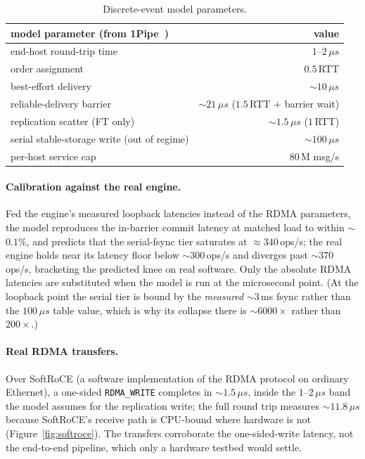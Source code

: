 \begin{table}[ht]\centering\small
\begin{tabular}{lr}
\toprule
model parameter (from 1Pipe~\citep{li2021onepipe}) & value \\
\midrule
end-host round-trip time & $1$--$2\,\mu s$ \\
order assignment & $0.5$\,RTT \\
best-effort delivery & $\sim$$10\,\mu s$ \\
reliable-delivery barrier & $\sim$$21\,\mu s$ ($1.5$\,RTT $+$ barrier wait) \\
replication scatter (FT only) & $\sim$$1.5\,\mu s$ ($1$\,RTT) \\
serial stable-storage write (out of regime) & $\sim$$100\,\mu s$ \\
per-host service cap & $80$\,M msg/s \\
\bottomrule
\end{tabular}
\caption{Discrete-event model parameters.}
\label{tab:model}
\end{table}

\paragraph{Calibration against the real engine.} Fed the engine's measured
loopback latencies instead of the RDMA parameters, the model reproduces
the in-barrier commit latency at matched load to within $\sim$$0.1\%$, and
predicts that the serial-fsync tier saturates at $\approx$$340$\,ops/s;
the real engine holds near its latency floor below $\sim$$300$\,ops/s and
diverges past $\sim$$370$\,ops/s, bracketing the predicted knee on real
software. Only the absolute RDMA latencies are substituted when the model
is run at the microsecond point. (At the loopback point the serial tier is
bound by the \emph{measured} $\sim$$3$\,ms fsync rather than the
$100\,\mu s$ table value, which is why its collapse there is
$\sim$$6000\times$ rather than $200\times$.)

\paragraph{Real RDMA transfers.} Over SoftRoCE (a software implementation
of the RDMA protocol on ordinary Ethernet), a one-sided
\texttt{RDMA\_WRITE} completes in $\sim$$1.5\,\mu s$, inside the
$1$--$2\,\mu s$ band the model assumes for the replication write; the full
round trip measures $\sim$$11.8\,\mu s$ because SoftRoCE's receive path is
CPU-bound where hardware is not (Figure~\ref{fig:softroce}). The transfers
corroborate the one-sided-write latency, not the end-to-end pipeline,
which only a hardware testbed would settle.

